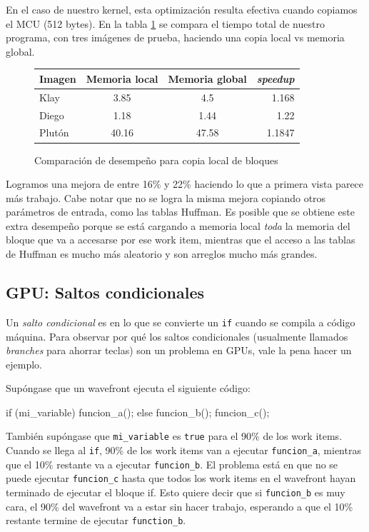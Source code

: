 {En el caso de nuestro kernel, esta optimización resulta efectiva cuando
copiamos el \gls{MCU} (512 bytes). En la tabla \ref{fig:gpucopy} se compara el tiempo
total de nuestro programa, con tres imágenes de prueba, haciendo una copia
local vs memoria global.

\begin{figure}[h]
    \begin{tabular}{ |l c c r| }
        \hline
        Imagen & Memoria local & Memoria global & \emph{speedup} \\
        \hline
        Klay & 3.85 & 4.5 & 1.168 \\
        Diego & 1.18 & 1.44 & 1.22 \\
        Plutón & 40.16 & 47.58 & 1.1847 \\
        \hline
    \end{tabular}
    \caption{Comparación de desempeño para copia local de bloques}
    \label{fig:gpucopy}
\end{figure}

Logramos una mejora de entre 16\% y 22\% haciendo lo que a primera vista parece
más trabajo. Cabe notar que no se logra la misma mejora copiando otros
parámetros de entrada, como las tablas Huffman. Es posible que se obtiene este
extra desempeño porque se está cargando a memoria local \emph{toda} la memoria
del bloque que va a accesarse por ese work item, mientras que el acceso a las
tablas de Huffman es mucho más aleatorio y son arreglos mucho más grandes.

\subsection{GPU: Saltos condicionales}

Un \emph{ salto condicional } es en lo que se convierte un \verb+if+ cuando
se compila a código máquina. Para observar por qué los saltos condicionales
(usualmente llamados \emph{branches} para ahorrar teclas) son un problema en
GPUs, vale la pena hacer un ejemplo.

Supóngase que un wavefront ejecuta el siguiente código:

\begin{code}[language=C][h]
    if (mi_variable) {
        funcion_a();
    } else {
        funcion_b();
    }
    funcion_c();
\end{code}

También supóngase que \verb+mi_variable+ es \verb+true+ para el 90\% de los work
items.  Cuando se llega al \verb+if+, 90\% de los work items van a ejecutar
\verb+funcion_a+, mientras que el 10\% restante va a ejecutar \verb+funcion_b+.
El problema está en que no se puede ejecutar \verb+funcion_c+ hasta que todos
los work items en el wavefront hayan terminado de ejecutar el bloque if. Esto
quiere decir que si \verb+funcion_b+ es muy cara, el 90\% del wavefront va a
estar sin hacer trabajo, esperando a que el 10\% restante termine de ejecutar
\verb+function_b+.

}

